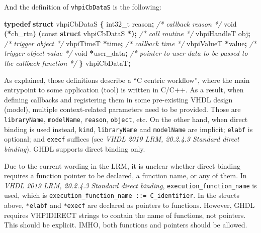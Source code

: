 \documentclass[
]{article}
\newenvironment{Shaded}{\begin{snugshade}}{\end{snugshade}}
\newcommand{\CommentTok}[1]{\textcolor[rgb]{0.56,0.35,0.01}{\textit{#1}}}
\newcommand{\DataTypeTok}[1]{\textcolor[rgb]{0.13,0.29,0.53}{#1}}
\newcommand{\KeywordTok}[1]{\textcolor[rgb]{0.13,0.29,0.53}{\textbf{#1}}}
\newcommand{\NormalTok}[1]{#1}
\newcommand{\OperatorTok}[1]{\textcolor[rgb]{0.81,0.36,0.00}{\textbf{#1}}}
\begin{document}
And the definition of \texttt{vhpiCbDataS} is the following:

\begin{Shaded}
\begin{Highlighting}[]
\KeywordTok{typedef} \KeywordTok{struct}\NormalTok{ vhpiCbDataS }\OperatorTok{\{}
  \DataTypeTok{int32\_t}\NormalTok{ reason}\OperatorTok{;}                              \CommentTok{/* callback reason */}
  \DataTypeTok{void} \OperatorTok{(*}\NormalTok{cb\_rtn}\OperatorTok{)} \OperatorTok{(}\DataTypeTok{const} \KeywordTok{struct}\NormalTok{ vhpiCbDataS }\OperatorTok{*);} \CommentTok{/* call routine */}
\NormalTok{  vhpiHandleT obj}\OperatorTok{;}                             \CommentTok{/* trigger object */}
\NormalTok{  vhpiTimeT }\OperatorTok{*}\NormalTok{time}\OperatorTok{;}                             \CommentTok{/* callback time */}
\NormalTok{  vhpiValueT }\OperatorTok{*}\NormalTok{value}\OperatorTok{;}                           \CommentTok{/* trigger object value */}
  \DataTypeTok{void} \OperatorTok{*}\NormalTok{user\_data}\OperatorTok{;}                             \CommentTok{/* pointer to user data to be passed to the callback function */}
\OperatorTok{\}}\NormalTok{ vhpiCbDataT}\OperatorTok{;}
\end{Highlighting}
\end{Shaded}

As explained, those definitions describe a ``C centric workflow'', where the main entrypoint to some application (tool) is written in C/C++. As a result, when defining callbacks and registering them in some pre-existing VHDL design (model), multiple context-related parameters need to be provided. Those are \texttt{libraryName}, \texttt{modelName}, \texttt{reason}, \texttt{object}, etc. On the other hand, when direct binding is used instead, \texttt{kind}, \texttt{libraryName} and \texttt{modelName} are implicit; \texttt{elabf} is optional; and \texttt{execf} suffices (see \emph{VHDL 2019 LRM, 20.2.4.3 Standard direct binding}). GHDL supports direct binding only.

Due to the current wording in the LRM, it is unclear whether direct binding requires a function pointer to be declared, a function name, or any of them. In \emph{VHDL 2019 LRM, 20.2.4.3 Standard direct binding}, \texttt{execution\_function\_name} is used, which is \texttt{execution\_function\_name\ ::=\ C\_identifier}. In the structs above, \texttt{*elabf} and \texttt{*execf} are declared as pointers to functions. However, GHDL requires VHPIDIRECT strings to contain the name of functions, not pointers. This should be explicit. IMHO, both functions and pointers should be allowed.
\end{document}
